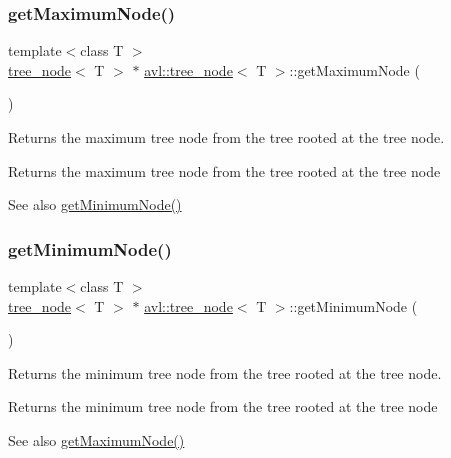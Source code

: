 \subsubsection{\texorpdfstring{get\+Maximum\+Node()}{getMaximumNode()}}
{\footnotesize\ttfamily template$<$class T $>$ \\
\hyperlink{classavl_1_1tree__node}{tree\+\_\+node}$<$ T $>$ $\ast$ \hyperlink{classavl_1_1tree__node}{avl\+::tree\+\_\+node}$<$ T $>$\+::get\+Maximum\+Node (\begin{DoxyParamCaption}{ }\end{DoxyParamCaption})}

Returns the maximum tree node from the tree rooted at the tree node. \begin{DoxyReturn}{Returns}
the maximum tree node from the tree rooted at the tree node 
\end{DoxyReturn}
\begin{DoxySeeAlso}{See also}
\hyperlink{classavl_1_1tree__node_af2a04b44c2d9abfab772dcf61143df35}{get\+Minimum\+Node()} 
\end{DoxySeeAlso}
\mbox{\label{classavl_1_1tree__node_af2a04b44c2d9abfab772dcf61143df35}} 
\subsubsection{\texorpdfstring{get\+Minimum\+Node()}{getMinimumNode()}}
{\footnotesize\ttfamily template$<$class T $>$ \\
\hyperlink{classavl_1_1tree__node}{tree\+\_\+node}$<$ T $>$ $\ast$ \hyperlink{classavl_1_1tree__node}{avl\+::tree\+\_\+node}$<$ T $>$\+::get\+Minimum\+Node (\begin{DoxyParamCaption}{ }\end{DoxyParamCaption})}

Returns the minimum tree node from the tree rooted at the tree node. \begin{DoxyReturn}{Returns}
the minimum tree node from the tree rooted at the tree node 
\end{DoxyReturn}
\begin{DoxySeeAlso}{See also}
\hyperlink{classavl_1_1tree__node_a47e9411fcd44d4ea5b8403e1ae757060}{get\+Maximum\+Node()} 
\end{DoxySeeAlso}
\mbox{\label{classavl_1_1tree__node_ad8ea20d9c3867f9223510ce5e780b22d}} 

